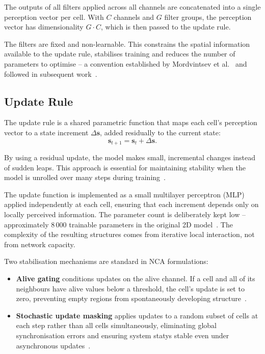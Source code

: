 The outputs of all filters applied across all channels are concatenated into a single
perception vector per cell. With $C$ channels and $G$ filter groups, the perception
vector has dimensionality $G \cdot C$, which is then passed to the update rule.

The filters are fixed and non-learnable. This constrains the spatial information
available to the update rule, stabilises training and reduces the number of
parameters to optimise -- a convention established by Mordvintsev et
al.~\cite{Mordvintsev2020} and followed in subsequent
work~\cite{Sudhakaran2021, Rossi2021, Aadityaza2024}.

\subsection{Update Rule}

The update rule is a shared parametric function that maps each cell's perception
vector to a state increment $\Delta \mathbf{s}$, added residually to the current
state:
\[
\mathbf{s}_{t+1} = \mathbf{s}_t + \Delta \mathbf{s}.
\]

By using a residual update, the model makes small, incremental changes instead of 
sudden leaps. This approach is essential for maintaining stability when the model
is unrolled over many steps during training~\cite{Mordvintsev2020}. 

The update function is implemented as a small multilayer perceptron (MLP) applied
independently at each cell, ensuring that each increment depends only on locally
perceived information. The parameter count is deliberately kept low -- approximately
8\,000 trainable parameters in the original 2D model~\cite{Mordvintsev2020}. The
complexity of the resulting structures comes from iterative local interaction, not
from network capacity.

Two stabilisation mechanisms are standard in NCA formulations:
\begin{itemize}
    \item \textbf{Alive gating} conditions updates on the alive channel. If a cell
    and all of its neighbours have alive values below a threshold, the cell's update
    is set to zero, preventing empty regions from spontaneously developing
    structure~\cite{Mordvintsev2020}.
    \item \textbf{Stochastic update masking} applies updates to a random subset of
    cells at each step rather than all cells simultaneously, eliminating global 
    synchronisation errors and ensuring system statys stable even under asynchronous 
    updates~\cite{Mordvintsev2020}.
\end{itemize}

